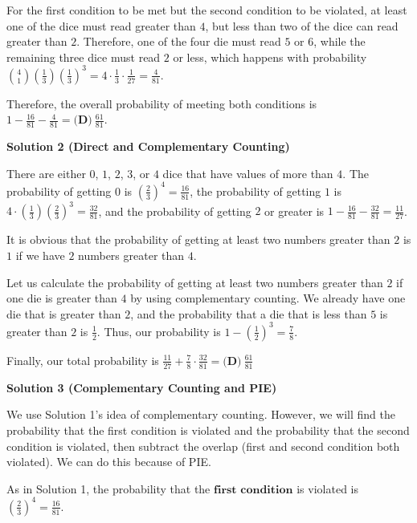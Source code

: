 \begin{enumerate}
 For the first condition to be met but the second condition to be violated, at least one of the dice must read greater than $4$, but less than two of the dice can read greater than $2$. Therefore, one of the four die must read $5$ or $6$, while the remaining three dice must read $2$ or less, which happens with probability ${4 \choose 1} \left(\frac13\right) \left(\frac13\right)^3 = 4 \cdot \frac13 \cdot \frac{1}{27} = \frac{4}{81}$.

 Therefore, the overall probability of meeting both conditions is $1 - \frac{16}{81} - \frac{4}{81} = \boxed{\textbf{(D)}\ \frac{61}{81}}$.

 



\textbf{Solution 2 (Direct and Complementary Counting)}

There are either $0$, $1$, $2$, $3$, or $4$ dice that have values of more than $4$. The probability of getting $0$ is $\left(\frac{2}{3}\right)^4 = \frac{16}{81}$, the probability of getting $1$ is $4 \cdot \left(\frac{1}{3}\right)\left(\frac{2}{3}\right)^3 = \frac{32}{81}$, and the probability of getting $2$ or greater is $1 - \frac{16}{81} - \frac{32}{81} = \frac{11}{27}$. 

 It is obvious that the probability of getting at least two numbers greater than $2$ is $1$ if we have $2$ numbers greater than $4$.

 Let us calculate the probability of getting at least two numbers greater than $2$ if one die is greater than $4$ by using complementary counting. We already have one die that is greater than $2$, and the probability that a die that is less than $5$ is greater than $2$ is $\frac{1}{2}$. Thus, our probability is $1 - \left(\frac{1}{2}\right)^3 = \frac{7}{8}$.

 Finally, our total probability is $\frac{11}{27} + \frac{7}{8}\cdot\frac{32}{81} = \boxed{\textbf{(D)}\ \frac{61}{81}}$




\textbf{Solution 3 (Complementary Counting and PIE)}

We use Solution 1's idea of complementary counting. However, we will find the probability that the first condition is violated and the probability that the second condition is violated, then subtract the overlap (first and second condition both violated). We can do this because of PIE.

 As in Solution 1, the probability that the $\textbf{first condition}$ is violated is $\left(\frac{2}{3}\right)^4 = \frac{16}{81}.$


\end{enumerate}
